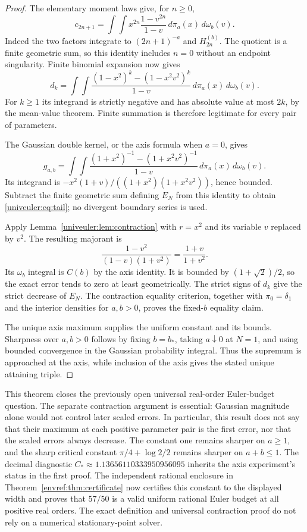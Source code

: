 \begin{proof}
The elementary moment laws give, for $n\ge0$,
\[
 c_{2n+1}=\int\!\!\int x^{2n}
             \frac{1-v^{2n}}{1-v}\,d\pi_a(x)\,d\omega_b(v).
\]
Indeed the two factors integrate to $(2n+1)^{-a}$ and $H_{2n}^{(b)}$.
The quotient is a finite geometric sum, so this identity includes $n=0$
without an endpoint singularity. Finite binomial expansion now gives
\[
 d_k=\int\!\!\int
       \frac{(1-x^2)^k-(1-x^2v^2)^k}{1-v}
                 \,d\pi_a(x)\,d\omega_b(v).
\]
For $k\ge1$ its integrand is strictly negative and has absolute value
at most $2k$, by the mean-value theorem. Finite summation is therefore
legitimate for every pair of parameters.

The Gaussian double kernel, or the axis formula when $a=0$, gives
\[
 g_{a,b}=\int\!\!\int
 \frac{(1+x^2)^{-1}-(1+x^2v^2)^{-1}}{1-v}
                    \,d\pi_a(x)\,d\omega_b(v).
\]
Its integrand is $-x^2(1+v)/((1+x^2)(1+x^2v^2))$, hence bounded.
Subtract the finite geometric sum defining $E_N$ from this identity
to obtain \eqref{univeuler:eq:tail}; no divergent boundary series is used.

Apply Lemma~\ref{univeuler:lem:contraction} with $r=x^2$ and its
variable $v$ replaced by $v^2$. The resulting majorant is
\[
 \frac{1-v^2}{(1-v)(1+v^2)}=\frac{1+v}{1+v^2}.
\]
Its $\omega_b$ integral is $C(b)$ by the axis identity.
It is bounded by $(1+\sqrt2)/2$, so the exact error tends to zero
at least geometrically. The strict signs of $d_k$ give the strict
decrease of $E_N$. The contraction equality criterion, together with
$\pi_0=\delta_1$ and the interior densities for $a,b>0$, proves the
fixed-$b$ equality claim.

The unique axis maximum supplies the uniform constant and its bounds.
Sharpness over $a,b>0$ follows by fixing $b=b_*$, taking $a\downarrow0$
at $N=1$, and using bounded convergence in the Gaussian probability
integral. Thus the supremum is approached at the axis, while inclusion
of the axis gives the stated unique attaining triple.
\end{proof}

This theorem closes the previously open universal real-order Euler-budget
question. The separate contraction argument is essential: Gaussian
magnitude alone would not control later scaled errors. In particular,
this result does not say that their maximum at each positive parameter
pair is the first error, nor that the scaled errors always decrease.
The constant one remains sharper on $a\ge1$, and the sharp critical
constant $\pi/4+\log2/2$ remains sharper on $a+b\le1$.
The decimal diagnostic $C_*\approx1.13656110333950956095$ inherits the
axis experiment's status in the first proof. The independent rational
enclosure in Theorem~\ref{envref:thm:certificate} now certifies this
constant to the displayed width and proves that $57/50$ is a valid
uniform rational Euler budget at all positive real orders. The exact
definition and universal contraction proof do not rely on a numerical
stationary-point solver.
